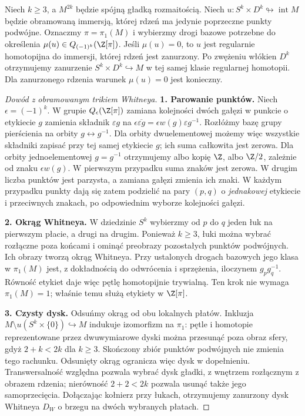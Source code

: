 \begin{stwierdzenie}
\label{prop:osadzenie-Wall-52-22}
Niech $k\geq3$, a $M^{2k}$ będzie spójną gładką
rozmaitością. Niech $u:S^k\times D^k\looparrowright
\operatorname{int}M$ będzie obramowaną immersją,
której rdzeń ma jedynie poprzeczne punkty podwójne.
Oznaczmy $\pi=\pi_1(M)$ i wybierzmy drogi bazowe
potrzebne do określenia
$\mu(u)\in Q_{(-1)^k}(\Z[\pi])$.
Jeśli $\mu(u)=0$, to $u$ jest regularnie homotopijna
do immersji, której rdzeń jest zanurzony. Po
zwężeniu włókien $D^k$ otrzymujemy zanurzenie
$S^k\times D^k\hookrightarrow M$ w tej samej
klasie regularnej homotopii. Dla zanurzonego rdzenia
warunek $\mu(u)=0$ jest konieczny.
\end{stwierdzenie}
\begin{proof}[Dowód z obramowanym trikiem Whitneya]
\textbf{1. Parowanie punktów.}
Niech $\epsilon=(-1)^k$. W grupie
$Q_\epsilon(\Z[\pi])$ zamiana kolejności dwóch
gałęzi w punkcie o etykiecie $g$ zamienia składnik
$\varepsilon g$ na $\epsilon\overline{\varepsilon g}
=\epsilon w(g)\varepsilon g^{-1}$.
Rozłóżmy bazę grupy pierścienia na orbity
$g\leftrightarrow g^{-1}$. Dla orbity dwuelementowej
możemy więc wszystkie składniki zapisać przy tej
samej etykiecie $g$; ich suma całkowita jest zerowa.
Dla orbity jednoelementowej $g=g^{-1}$ otrzymujemy
albo kopię $\Z$, albo $\Z/2$, zależnie od znaku
$\epsilon w(g)$. W pierwszym przypadku suma znaków
jest zerowa. W drugim liczba punktów jest parzysta,
a zamiana gałęzi zmienia ich znaki. W każdym
przypadku punkty dają się zatem podzielić na pary
$(p,q)$ o \emph{jednakowej} etykiecie i przeciwnych
znakach, po odpowiednim wyborze kolejności gałęzi.

\textbf{2. Okrąg Whitneya.}
W dziedzinie $S^k$ wybierzmy od $p$ do $q$ jeden
łuk na pierwszym płacie, a drugi na drugim.
Ponieważ $k\geq3$, łuki można wybrać rozłączne
poza końcami i ominąć preobrazy pozostałych
punktów podwójnych. Ich obrazy tworzą okrąg
Whitneya. Przy ustalonych drogach bazowych jego
klasa w $\pi_1(M)$ jest, z dokładnością do
odwrócenia i sprzężenia, iloczynem $g_p g_q^{-1}$.
Równość etykiet daje więc pętlę homotopijnie
trywialną. Ten krok nie wymaga $\pi_1(M)=1$;
właśnie temu służą etykiety w $\Z[\pi]$.

\textbf{3. Czysty dysk.}
Odsuńmy okrąg od obu lokalnych płatów. Inkluzja
$M\setminus u(S^k\times\{0\})\hookrightarrow M$
indukuje izomorfizm na $\pi_1$: pętle i homotopie
reprezentowane przez dwuwymiarowe dyski można
przesunąć poza obraz sfery, gdyż
$2+k<2k$ dla $k\geq3$. Skończony zbiór punktów
podwójnych nie zmienia tego rachunku. Odsunięty
okrąg ogranicza więc dysk w dopełnieniu.
Transwersalność względna pozwala wybrać dysk
gładki, z wnętrzem rozłącznym z obrazem rdzenia;
nierówność $2+2<2k$ pozwala usunąć także jego
samoprzecięcia. Dołączając kołnierz przy łukach,
otrzymujemy zanurzony dysk Whitneya $D_W$ o brzegu
na dwóch wybranych płatach.


\end{proof}
